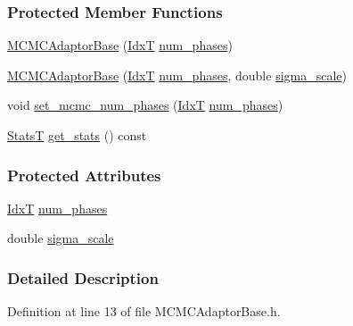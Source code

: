 \subsubsection*{Protected Member Functions}
\begin{DoxyCompactItemize}
\item 
\hyperlink{classmappel_1_1MCMCAdaptorBase_ae81fbae5dae730e851ee135cca76c9b3}{M\+C\+M\+C\+Adaptor\+Base} (\hyperlink{namespacemappel_ab17ec0f30b61ece292439d7ece81d3a8}{IdxT} \hyperlink{classmappel_1_1MCMCAdaptorBase_a44b90a984ace712584074dc17831fe25}{num\+\_\+phases})
\item 
\hyperlink{classmappel_1_1MCMCAdaptorBase_aef72a001000ee2f4d6bed9ec3c2150ba}{M\+C\+M\+C\+Adaptor\+Base} (\hyperlink{namespacemappel_ab17ec0f30b61ece292439d7ece81d3a8}{IdxT} \hyperlink{classmappel_1_1MCMCAdaptorBase_a44b90a984ace712584074dc17831fe25}{num\+\_\+phases}, double \hyperlink{classmappel_1_1MCMCAdaptorBase_a76312f7d589bf3f3e754beca174b884b}{sigma\+\_\+scale})
\item 
void \hyperlink{classmappel_1_1MCMCAdaptorBase_ad6c75e327e8732abc2654492f372563a}{set\+\_\+mcmc\+\_\+num\+\_\+phases} (\hyperlink{namespacemappel_ab17ec0f30b61ece292439d7ece81d3a8}{IdxT} \hyperlink{classmappel_1_1MCMCAdaptorBase_a44b90a984ace712584074dc17831fe25}{num\+\_\+phases})
\item 
\hyperlink{namespacemappel_a04ab395b0cf82c4ce68a36b2212649a5}{StatsT} \hyperlink{classmappel_1_1MCMCAdaptorBase_ad6054973528dfad89976882cdb50aba5}{get\+\_\+stats} () const 
\end{DoxyCompactItemize}
\subsubsection*{Protected Attributes}
\begin{DoxyCompactItemize}
\item 
\hyperlink{namespacemappel_ab17ec0f30b61ece292439d7ece81d3a8}{IdxT} \hyperlink{classmappel_1_1MCMCAdaptorBase_a44b90a984ace712584074dc17831fe25}{num\+\_\+phases}
\item 
double \hyperlink{classmappel_1_1MCMCAdaptorBase_a76312f7d589bf3f3e754beca174b884b}{sigma\+\_\+scale}
\end{DoxyCompactItemize}


\subsubsection{Detailed Description}


Definition at line 13 of file M\+C\+M\+C\+Adaptor\+Base.\+h.



